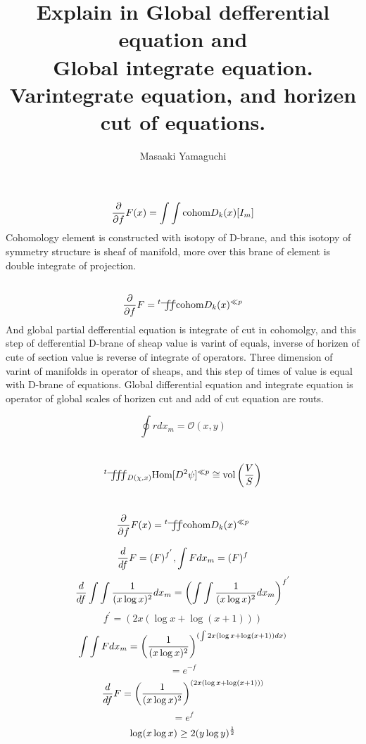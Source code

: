 \documentclass{jsarticle}
\begin{document}
\title{Explain in Global defferential equation and \\
Global integrate equation. \\
Varintegrate equation, and horizen cut of equations.}
\author{Masaaki Yamaguchi}
\date{}
\maketitle


\newcommand{\variint}{%
	\begin{picture}(15,30)
		\put(0,0){
			$ \iint $}
		\put(0,5){\line(15,0){15}}
	\end{picture} %
}

\newcommand{\variiint}{%
	\begin{picture}(20,30)
		\put(0,0){
			$ \iiint $}
		\put(0,5){\line(15,0){20}}
	\end{picture} %
}



 $$ {\partial \over \partial f}F(x) = \int \int \text{cohom}D_k(x)[I_m]  $$
 Cohomology element is constructed with isotopy of D-brane,
 and this isotopy of symmetry structure is sheaf of manifold,
 more over this brane of element is double integrate of projection.
 $$ {\partial \over \partial f}F = {{}^t \variint} \text{cohom}D_k(x)^{\ll p} $$
 And global partial defferential equation is integrate of cut in cohomolgy,
 and this step of defferential D-brane of sheap value is varint of equals,
 inverse of horizen of cute of section value is reverse of integrate of 
 operators. Three dimension of varint of manifolds in operator of sheaps,
 and this step of times of value is equal with D-brane of equations.
 Global differential equation and integrate equation is operator of 
 global scales of horizen cut and add of cut equation are routs.

 $$ \oint r dx_m = \mathcal{O}(x,y) $$

 $$ {{}^t \variiint}_{{D(\chi,x)}} \text{Hom}[D^2 \psi]^{\ll p} \cong 
 \text{vol}\left({V \over S}\right) $$

 $$ {\partial \over \partial f}F(x) = {{}^t \variint} 
 \text{cohom}D_k(x)^{\ll p} $$

 $$ {d \over df}F = (F)^{f^{'}}, \int F dx_m = (F)^{f}  $$
 $$ {d \over df}\int \int{1 \over (x \log x)^2}dx_m =
 \left(\int \int{1 \over (x \log x)^2}dx_m \right)^{f^{'}}  $$
 $$ f^{'} = (2x (\log x + \log (x + 1))) $$
  $$  \int \int F dx_m = \left({1 \over (x \log x)^2}\right)^{
	  (\int 2x (\log x + \log (x + 1))dx)} $$ 
   $$= e^{-f} $$
  $$ {d \over df}F = \left({1 \over (x \log x)^2}\right)^{
	  (2x (\log x + \log (x + 1))) } $$  
  $$= e^{f} $$
  $$ \log (x \log x) \ge 2(y \log y)^{1 \over 2} $$
\end{document}
